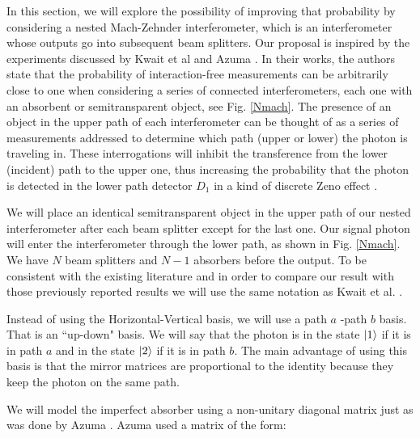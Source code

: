 \documentclass[12pt]{book}
\begin{document}
In this section, we will explore the possibility of improving that probability by considering a nested Mach-Zehnder interferometer, which is an interferometer whose outputs go into subsequent beam splitters. Our proposal is inspired by the experiments discussed by Kwait et al \cite{5} and Azuma \cite{Azuma}. In their works, the authors state that the probability of interaction-free measurements can be arbitrarily close to one when considering a series of connected interferometers, each one with an absorbent or semitransparent object, see Fig. \ref{Nmach}. The presence of an object in the upper path of each interferometer can be thought of as a series of measurements addressed to determine which path (upper or lower) the photon is traveling in. These interrogations will inhibit the transference from the lower (incident) path to the upper one, thus increasing the probability that the photon is detected in the lower path detector $D_{1}$ in a kind of discrete Zeno effect \cite{5}.

  We will place an identical semitransparent object in the upper path of our nested interferometer after each beam splitter except for the last one. Our signal photon will enter the interferometer through the lower path, as shown in Fig. \ref{Nmach}. We have $N$ beam splitters and $N-1$ absorbers before the output. To be consistent with the existing literature and in order to compare our result with those previously reported results we will use the same notation as Kwait et al. \cite{5}.
 
 
Instead of using the Horizontal-Vertical basis, we will use a path $a$ -path $b$ basis. That is an ``up-down" basis. We will say that the photon is in the state $\ket{1}$ if it is in path $a$ and in the state $\ket{2}$ if it is in path $b$. The main advantage of using this basis is that the mirror matrices are proportional to the identity because they keep the photon on the same path.
 

 
 
  We will model the imperfect absorber using a non-unitary diagonal matrix just as was done by  Azuma \cite{Azuma}. Azuma used a matrix of the form:
 
\end{document}
